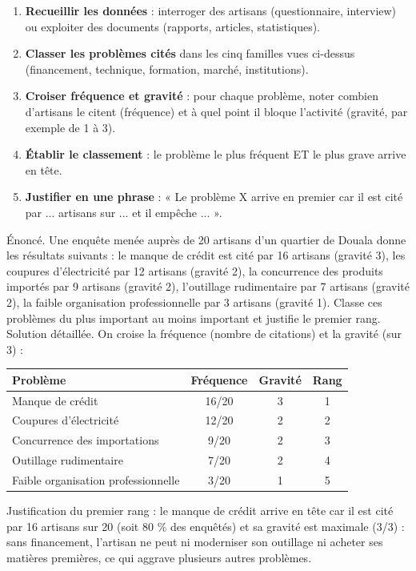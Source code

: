 \documentclass[11pt]{article}
\begin{document}
\begin{methode}
\begin{enumerate}
\item \textbf{Recueillir les données} : interroger des artisans (questionnaire, interview) ou exploiter des documents (rapports, articles, statistiques).
\item \textbf{Classer les problèmes cités} dans les cinq familles vues ci-dessus (financement, technique, formation, marché, institutions).
\item \textbf{Croiser fréquence et gravité} : pour chaque problème, noter combien d'artisans le citent (fréquence) et à quel point il bloque l'activité (gravité, par exemple de 1 à 3).
\item \textbf{Établir le classement} : le problème le plus fréquent ET le plus grave arrive en tête.
\item \textbf{Justifier en une phrase} : « Le problème X arrive en premier car il est cité par ... artisans sur ... et il empêche ... ».
\end{enumerate}
\end{methode}

\begin{exoresolu}
Énoncé. Une enquête menée auprès de 20 artisans d'un quartier de Douala donne les résultats suivants : le manque de crédit est cité par 16 artisans (gravité 3), les coupures d'électricité par 12 artisans (gravité 2), la concurrence des produits importés par 9 artisans (gravité 2), l'outillage rudimentaire par 7 artisans (gravité 2), la faible organisation professionnelle par 3 artisans (gravité 1). Classe ces problèmes du plus important au moins important et justifie le premier rang.
\tcblower
Solution détaillée. On croise la fréquence (nombre de citations) et la gravité (sur 3) :
\begin{center}
\begin{tabularx}{\linewidth}{|X|c|c|c|}\hline
\rowcolor{popblueL} \textbf{Problème} & \textbf{Fréquence} & \textbf{Gravité} & \textbf{Rang} \\ \hline
Manque de crédit & 16/20 & 3 & 1 \\ \hline
Coupures d'électricité & 12/20 & 2 & 2 \\ \hline
Concurrence des importations & 9/20 & 2 & 3 \\ \hline
Outillage rudimentaire & 7/20 & 2 & 4 \\ \hline
Faible organisation professionnelle & 3/20 & 1 & 5 \\ \hline
\end{tabularx}
\end{center}
Justification du premier rang : le manque de crédit arrive en tête car il est cité par 16 artisans sur 20 (soit 80 \% des enquêtés) et sa gravité est maximale (3/3) : sans financement, l'artisan ne peut ni moderniser son outillage ni acheter ses matières premières, ce qui aggrave plusieurs autres problèmes.
\end{exoresolu}
\end{document}
